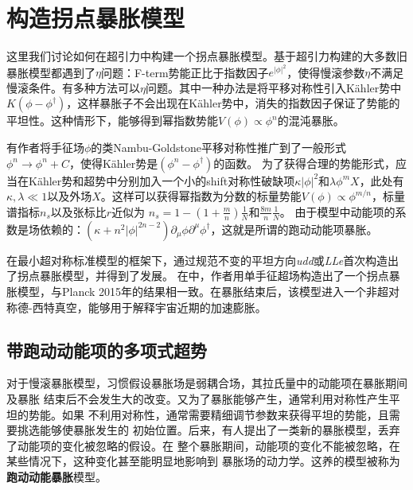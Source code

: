 \section{构造拐点暴胀模型}
这里我们讨论如何在超引力中构建一个拐点暴胀模型。基于超引力构建的大多数旧暴胀模型\citep{freedman1989progress,deser1976consistent,wess1992supersymmetry}都遇到了$\eta$问题\citep{yamaguchi2011supergravity}：F-term势能正比于指数因子$e^{|\phi|^2}$，使得慢滚参数$\eta$不满足慢滚条件。有多种方法可以$\eta$问题\citep{stewart1995inflation,linde1994hybrid,linde1997hybrid,panagiotakopoulos1997hybrid}。其中一种办法是将平移对称性引入K\"ahler势中$K(\phi-\phi^\dagger)$，这样暴胀子不会出现在K\"ahler势中，消失的指数因子保证了势能的平坦性。这种情形下，能够得到幂指数势能$V(\phi)\propto
\phi^n$的混沌暴胀。

有作者\citep{takahashi2010linear,nakayama2010running,kasuya2014flat}将手征场$\phi$的类Nambu-Goldstone平移对称性推广到了一般形式$\phi^n\rightarrow
\phi^n+C$，使得K\"ahler势是$\left(\phi^n-\phi^\dagger\right)$的函数。
为了获得合理的势能形式，应当在K\"{a}hler势和超势中分别加入一个小的shift对称性破缺项$\kappa|\phi|^2$和$\lambda\phi^m
X$，此处有$\kappa,\lambda\ll
1$以及外场$X$。这样可以获得幂指数为分数的标量势能$V(\phi)\propto
\phi^{m/n}$，标量谱指标$n_s$以及张标比$r$近似为
$n_s=1-(1+\frac{m}{n})\frac{1}{N}$和$\frac{8m}{n}\frac{1}{N}$\citep{nakayama2010running}。
由于模型中动能项的系数是场依赖的：$(\kappa+n^2|\phi|^{2n-2})\partial_{\mu}\phi\partial^{\mu}\phi^{\dag}$，这就是所谓的跑动动能项暴胀。

在最小超对称标准模型的框架下，通过规范不变的平坦方向\textit{udd}或\textit{LLe}首次构造出了拐点暴胀模型\citep{allahverdi2006gauge}，并得到了发展\citep{allahverdi2007term,enqvist2010inflection,hotchkiss2012observable,chatterjee2015bound}。
在\citep{gao2015inflection}中，作者用单手征超场构造出了一个拐点暴胀模型，与Planck
2015年的结果相一致。在暴胀结束后，该模型进入一个非超对称德-西特真空，能够用于解释宇宙近期的加速膨胀。

\subsection{带跑动动能项的多项式超势}
对于慢滚暴胀模型，习惯假设暴胀场是弱耦合场，其拉氏量中的动能项在暴胀期间及暴胀
结束后不会发生大的改变。又为了暴胀能够产生，通常利用对称性产生平坦的势能。如果
不利用对称性，通常需要精细调节参数来获得平坦的势能，且需要挑选能够使暴胀发生的
初始位置。后来，有人提出了一类新的暴胀模型，丢弃了动能项的变化被忽略的假设。在
整个暴胀期间，动能项的变化不能被忽略，在某些情况下，这种变化甚至能明显地影响到
暴胀场的动力学。这养的模型被称为\textbf{跑动动能暴胀}模型。


